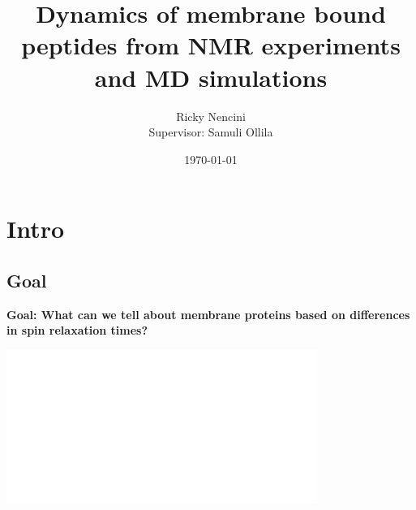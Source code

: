 \documentclass{beamer}
\title[Models for phosphomembranes]{Dynamics of membrane bound peptides from NMR experiments and MD simulations} %
\author[Ricky Nencini]{Ricky Nencini\\ \small Supervisor: Samuli Ollila} %
\institute[IOCB] %
{
Faculty of Science, University of Helsinki\\
Institute of Biotechnology \\ 
\texttt{[image: pictures/Carolinum\_Logo.pdf]} \hspace{0.1cm}
\texttt{[image: pictures/logo.eps]} \hspace{0.1cm}  %
\texttt{[image: pictures/logo\_nature.pdf]} \\
\medskip
\textit{ricky.nencini@helsinki.fi} %
}
\date{\today} %
\begin{document}
\def\inserttotalframenumber{28}

\section{Intro}




\begin{frame}
\titlepage %
\end{frame}



\subsection{Goal}






\begin{frame}
\begin{center}
\Large{\centering
\textbf{Goal: What can we tell about membrane proteins based on differences in spin relaxation times?} \\}

\vspace{0.5cm}

\includegraphics[height=5cm]{can_we0.pdf}
\end{center}
\end{frame}
\end{document}
